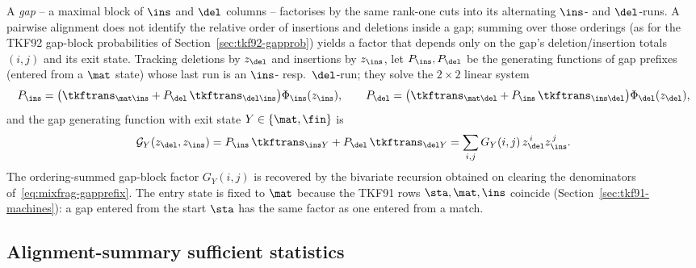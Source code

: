 A \emph{gap} -- a maximal block of $\ins$ and $\del$ columns -- factorises by the
same rank-one cuts into its alternating $\ins$- and $\del$-runs.
A pairwise alignment does not identify the relative order of insertions and
deletions inside a gap; summing over those orderings (as for the TKF92 gap-block
probabilities of Section~\ref{sec:tkf92-gapprob}) yields a factor that depends
only on the gap's deletion/insertion totals $(i,j)$ and its exit state.
Tracking deletions by $z_\del$ and insertions by $z_\ins$, let $P_\ins,P_\del$ be
the generating functions of gap prefixes (entered from a $\mat$ state) whose last
run is an $\ins$- resp.\ $\del$-run; they solve the $2\times2$ linear system
\begin{equation}\label{eq:mixfrag-gapprefix}
P_\ins=\bigl(\tkftrans_{\mat\ins}+P_\del\,\tkftrans_{\del\ins}\bigr)\Phi_\ins(z_\ins),
\qquad
P_\del=\bigl(\tkftrans_{\mat\del}+P_\ins\,\tkftrans_{\ins\del}\bigr)\Phi_\del(z_\del),
\end{equation}
and the gap generating function with exit state $Y\in\{\mat,\fin\}$ is
\begin{equation}\label{eq:mixfrag-gapgf}
\mathcal{G}_{Y}(z_\del,z_\ins)
= P_\ins\,\tkftrans_{\ins Y}+P_\del\,\tkftrans_{\del Y}
= \sum_{i,j}G_Y(i,j)\,z_\del^{\,i} z_\ins^{\,j}.
\end{equation}
The ordering-summed gap-block factor $G_Y(i,j)$ is recovered by the bivariate
recursion obtained on clearing the denominators of~\eqref{eq:mixfrag-gapprefix}.
The entry state is fixed to $\mat$ because the TKF91 rows $\sta,\mat,\ins$
coincide (Section~\ref{sec:tkf91-machines}): a gap entered from the start $\sta$
has the same factor as one entered from a match.

\subsection{Alignment-summary sufficient statistics}
\label{sec:mixfrag-summary}

